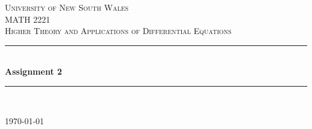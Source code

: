 \documentclass[a4paper]{article}
\begin{document}
\newlength{\strutheight}
\settoheight{\strutheight}{\strut}

\begin{titlepage}

\newcommand{\HRule}{\rule{\linewidth}{0.5mm}} %

\center %
 
\textsc{\LARGE University of New South Wales}\\[1.5cm] %
\textsc{\Large MATH 2221}\\[0.5cm] %
\textsc{\large Higher Theory and Applications of Differential Equations}\\[0.5cm] %

\HRule \\[0.4cm]
{ \huge \bfseries Assignment 2}\\[0.4cm] %
\HRule \\[1.5cm]


\begin{center} \large
\end{center}


\vspace{4cm}

{\today}\\[3cm] %

\vfill %

\end{titlepage}

\end{document}

